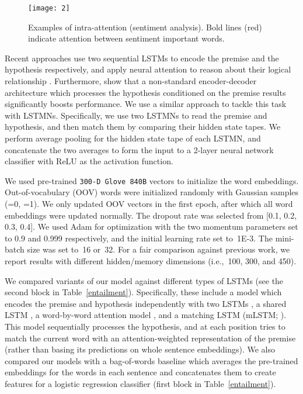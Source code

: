 \documentclass[11pt,letterpaper]{article}
\begin{document}
	\begin{figure}[t]
		\begin{center}
			\texttt{[image: 2]}
		\end{center}
		\caption{\label{sa} Examples of intra-attention
			(sentiment analysis). Bold lines (red) indicate
			attention between sentiment important words.}
\end{figure}
	
	
	Recent approaches use two sequential LSTMs to encode the
        premise and the hypothesis respectively, and apply neural
        attention to reason about their logical relationship
        \cite{rocktaschel2015reasoning,wang2015learning}. Furthermore,
         show that a non-standard
        encoder-decoder architecture which processes the hypothesis
        conditioned on the premise results significantly boosts
        performance.  We use a similar approach to tackle this task
        with LSTMNs.  Specifically, we use two LSTMNs to read the
        premise and hypothesis, and then match them by comparing their
        hidden state tapes. We perform average pooling for the hidden
        state tape of each LSTMN, and concatenate the two averages to
        form the input to a 2-layer neural network classifier with
        ReLU as the activation function.
	
	
	We used pre-trained \texttt{300-D Glove 840B} vectors
        \cite{pennington2014glove} to initialize the word
        embeddings. Out-of-vocabulary (OOV) words were initialized
        randomly with Gaussian samples (=0, =1). We only
        updated OOV vectors in the first epoch, after which all word
        embeddings were updated normally.  The dropout rate was
        selected from [0.1, 0.2, 0.3, 0.4].  We used Adam
        \cite{kingma2014adam} for optimization with the two momentum
        parameters set to 0.9 and 0.999 respectively, and the initial
        learning rate set to~1E-3. The mini-batch size was set to~16
        or~32.  For a fair comparison against previous work, we report
        results with different hidden/memory dimensions (i.e.,~100,
        300, and 450).
	





	We compared variants of our model against different types of
        LSTMs (see the second block in
        Table~\ref{entailment}). Specifically, these include a model
        which encodes the premise and hypothesis independently with
        two LSTMs \cite{bowman2015large}, a shared LSTM
        \cite{rocktaschel2015reasoning}, a word-by-word attention
        model \cite{rocktaschel2015reasoning}, and a matching LSTM
        (mLSTM; ). This model sequentially
        processes the hypothesis, and at each position tries to match
        the current word with an attention-weighted representation of
        the premise (rather than basing its predictions on whole
        sentence embeddings).  We also compared our models with a
        bag-of-words baseline which averages the pre-trained
        embeddings for the words in each sentence and
        concatenates them to create features for a logistic regression
        classifier (first block in Table~\ref{entailment}).  
\end{document}
